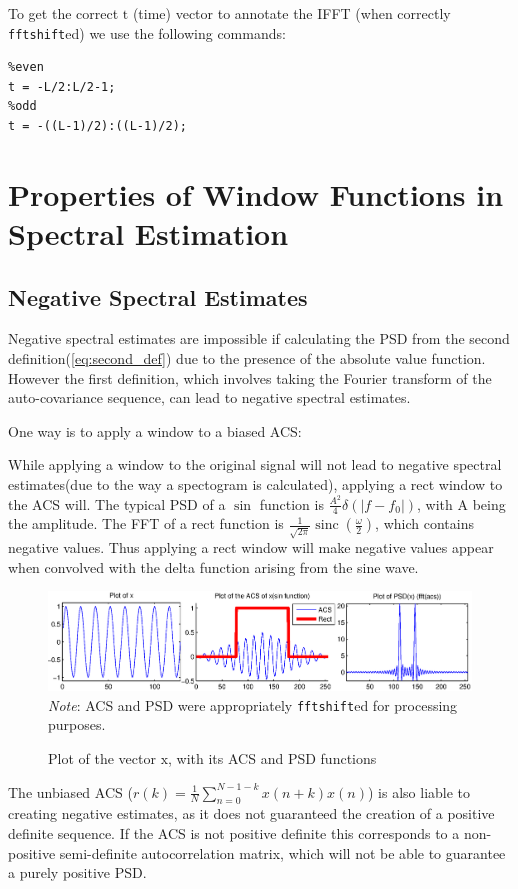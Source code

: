 \documentclass[10pt,twoside,a4paper]{report}
\DeclareMathOperator{\sinc}{sinc}
\begin{document}
To get the correct $\boldsymbol{\mathrm{t}}$ (time) vector to annotate the IFFT (when correctly \texttt{fftshift}ed) we use the following commands:
\begin{lstlisting}
%even
t = -L/2:L/2-1;
%odd
t = -((L-1)/2):((L-1)/2);
\end{lstlisting}
\section{Properties of Window Functions in Spectral Estimation}
\subsection{Negative Spectral Estimates}
\label{sec:neg_est}
Negative spectral estimates are impossible if calculating the PSD from the second definition(\ref{eq:second_def}) due to the presence of the absolute value function. However the first definition, which involves taking the Fourier transform of the auto-covariance sequence, can lead to negative spectral estimates.



One way is to apply a window to a biased ACS:


While applying a window to the original signal will not lead to negative spectral estimates(due to the way a spectogram is calculated), applying a rect window to the ACS will. The typical PSD of a $\sin$ function is $\frac{A^2}{4}\delta(|f-f_{0}|)$, with A being the amplitude. The FFT of a rect function is $\frac{1}{\sqrt{2\pi}} \sinc(\frac{\omega}{2})$, which contains negative values. Thus applying a rect window will make negative values appear when convolved with the delta function arising from the sine wave.

\begin{figure}[h!]
\includegraphics[width=\textwidth]{cw1im/2a.eps}
\textit{Note}: ACS and PSD were appropriately \texttt{fftshift}ed for processing purposes.
\caption{Plot of the vector $\boldsymbol{\mathrm{x}}$, with its ACS and PSD functions}
\label{fig:ex2}
\end{figure}


The unbiased ACS ($r(k) =\frac{1}{N} \sum_{n=0}^{N-1-k}x(n+k)x(n)$) is also liable to creating negative estimates, as it does not guaranteed the creation of a positive definite sequence.  If the ACS is not positive definite this corresponds to a non-positive semi-definite autocorrelation matrix, which will not be able to guarantee a purely positive PSD.
\end{document}
